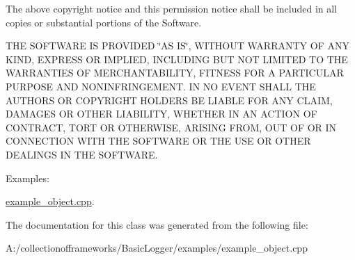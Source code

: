 The above copyright notice and this permission notice shall be included in all copies or substantial portions of the Software.

T\+HE S\+O\+F\+T\+W\+A\+RE IS P\+R\+O\+V\+I\+D\+ED \char`\"{}\+A\+S I\+S\char`\"{}, W\+I\+T\+H\+O\+UT W\+A\+R\+R\+A\+N\+TY OF A\+NY K\+I\+ND, E\+X\+P\+R\+E\+SS OR I\+M\+P\+L\+I\+ED, I\+N\+C\+L\+U\+D\+I\+NG B\+UT N\+OT L\+I\+M\+I\+T\+ED TO T\+HE W\+A\+R\+R\+A\+N\+T\+I\+ES OF M\+E\+R\+C\+H\+A\+N\+T\+A\+B\+I\+L\+I\+TY, F\+I\+T\+N\+E\+SS F\+OR A P\+A\+R\+T\+I\+C\+U\+L\+AR P\+U\+R\+P\+O\+SE A\+ND N\+O\+N\+I\+N\+F\+R\+I\+N\+G\+E\+M\+E\+NT. IN NO E\+V\+E\+NT S\+H\+A\+LL T\+HE A\+U\+T\+H\+O\+RS OR C\+O\+P\+Y\+R\+I\+G\+HT H\+O\+L\+D\+E\+RS BE L\+I\+A\+B\+LE F\+OR A\+NY C\+L\+A\+IM, D\+A\+M\+A\+G\+ES OR O\+T\+H\+ER L\+I\+A\+B\+I\+L\+I\+TY, W\+H\+E\+T\+H\+ER IN AN A\+C\+T\+I\+ON OF C\+O\+N\+T\+R\+A\+CT, T\+O\+RT OR O\+T\+H\+E\+R\+W\+I\+SE, A\+R\+I\+S\+I\+NG F\+R\+OM, O\+UT OF OR IN C\+O\+N\+N\+E\+C\+T\+I\+ON W\+I\+TH T\+HE S\+O\+F\+T\+W\+A\+RE OR T\+HE U\+SE OR O\+T\+H\+ER D\+E\+A\+L\+I\+N\+GS IN T\+HE S\+O\+F\+T\+W\+A\+RE. \begin{Desc}
\item[Examples\+: ]\par
\hyperlink{example_object_8cpp-example}{example\+\_\+object.\+cpp}.\end{Desc}


The documentation for this class was generated from the following file\+:\begin{DoxyCompactItemize}
\item 
A\+:/collectionofframeworks/\+Basic\+Logger/examples/example\+\_\+object.\+cpp\end{DoxyCompactItemize}
